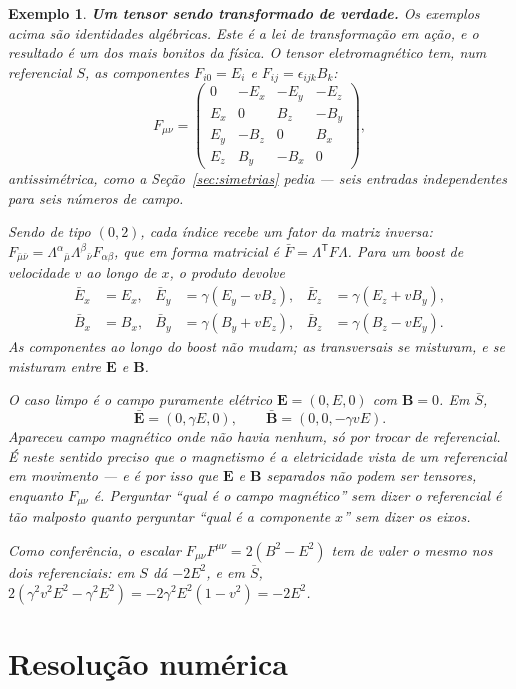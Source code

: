 \documentclass[12pt,a4paper,oneside]{book}
\theoremstyle{rgplain}
\newtheorem{example}{Exemplo}[chapter]
\theoremstyle{rgremark}
\begin{document}
\begin{example}\label{ex:boost-campo}
\textbf{Um tensor sendo transformado de verdade.} Os exemplos acima são
identidades algébricas. Este é a lei de transformação em ação, e o resultado é
um dos mais bonitos da física. O tensor eletromagnético tem, num referencial
$S$, as componentes $F_{i0}=E_i$ e $F_{ij}=\epsilon_{ijk}B_k$:
\[
  F_{\mu\nu}=\begin{pmatrix}
    0   & -E_x & -E_y & -E_z\\
    E_x & 0    & B_z  & -B_y\\
    E_y & -B_z & 0    & B_x\\
    E_z & B_y  & -B_x & 0
  \end{pmatrix},
\]
antissimétrica, como a Seção~\ref{sec:simetrias} pedia --- seis entradas
independentes para seis números de campo.

Sendo de tipo $(0,2)$, cada índice recebe um fator da matriz inversa:
$F_{\bar\mu\bar\nu}=\Lambda^{\alpha}{}_{\bar\mu}\Lambda^{\beta}{}_{\bar\nu}F_{\alpha\beta}$,
que em forma matricial é $\bar F=\Lambda^{\mathsf T}F\Lambda$. Para um
\emph{boost} de velocidade $v$ ao longo de $x$, o produto devolve
\begin{align*}
  \bar E_x&=E_x, & \bar E_y&=\gamma(E_y-vB_z), & \bar E_z&=\gamma(E_z+vB_y),\\
  \bar B_x&=B_x, & \bar B_y&=\gamma(B_y+vE_z), & \bar B_z&=\gamma(B_z-vE_y).
\end{align*}
As componentes ao longo do \emph{boost} não mudam; as transversais se
misturam, e se misturam \emph{entre} $\bm E$ e $\bm B$.

O caso limpo é o campo puramente elétrico $\bm E=(0,E,0)$ com $\bm B=0$. Em
$\bar S$,
\[
  \bar{\bm E}=(0,\gamma E,0),\qquad \bar{\bm B}=(0,0,-\gamma v E).
\]
Apareceu campo magnético onde não havia nenhum, só por trocar de referencial.
É neste sentido preciso que o magnetismo é a eletricidade vista de um
referencial em movimento --- e é por isso que $\bm E$ e $\bm B$ separados
\emph{não} podem ser tensores, enquanto $F_{\mu\nu}$ é. Perguntar ``qual é o
campo magnético'' sem dizer o referencial é tão malposto quanto perguntar
``qual é a componente $x$'' sem dizer os eixos.

Como conferência, o escalar $F_{\mu\nu}F^{\mu\nu}=2(B^2-E^2)$ tem de valer o
mesmo nos dois referenciais: em $S$ dá $-2E^2$, e em $\bar S$,
$2(\gamma^2v^2E^2-\gamma^2E^2)=-2\gamma^2E^2(1-v^2)=-2E^2$.
\end{example}

\clearpage
\section{Resolução numérica}
\label{sec:numerica-tensores}
\end{document}
